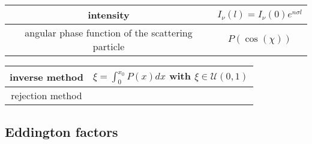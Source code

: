 \documentclass[../main/main.tex]{subfiles}
\begin{document}
\begin{center}
\centering
{\tabulinesep=1.5mm
\begin{tabu}{|c|c|}
\hline 
intensity & $I_{\nu}(l) = I_{\nu}(0)e^{n \sigma l}$ \\ \hline
angular phase function of the scattering particle & $P(\cos(\chi))$ \\ \hline

\end{tabu}}
\end{center}

\begin{center}
\centering
{\tabulinesep=1.5mm
\begin{tabu}{|c|c|}
\hline 
inverse method & $\xi = \int_0 ^{x_0} P(x) dx $ with $\xi \in \mathcal{U}(0,1)$ \\ \hline

rejection method & \\ \hline
\end{tabu}}
\end{center}

\subsection{Eddington factors}
\end{document}
